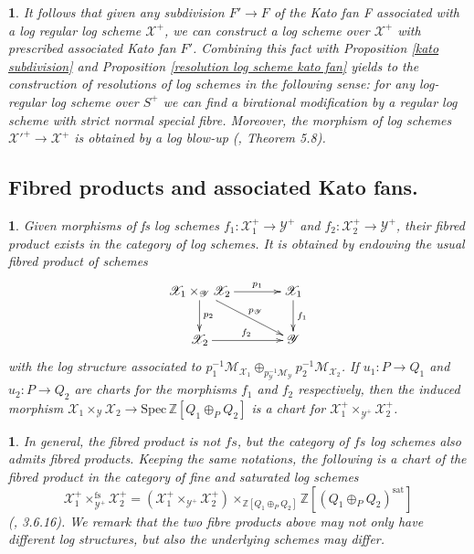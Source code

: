\documentclass{amsart}%
\numberwithin{equation}{subsection}
\theoremstyle{plain2}
\theoremstyle{definition2}
\theoremstyle{stepstyle}
\theoremstyle{point}
\theoremstyle{subpoint}
\newtheorem{subpoint}[equation]{}%
\newcommand{\spa}[1]{\begin{subpoint}#1\end{subpoint}}           %
\newcommand{\Z}{\ensuremath{\mathbb{Z}}}
\newcommand{\cX}{\ensuremath{\mathscr{X}}}
\newcommand{\caM}{\ensuremath{\mathcal{M}}}
\newcommand{\cY}{\ensuremath{\mathscr{Y}}}
\renewcommand{\cY}{\ensuremath{\mathscr{Y}}}
\newcommand{\Spec}{\ensuremath{\mathrm{Spec}\,}}
\begin{document}
\spa{\label{rem resolution via subd}
It follows that given any subdivision $F' \rightarrow F$ of the Kato fan F associated with a log regular log scheme $\cX^+$, we can construct a log scheme over $\cX^+$ with prescribed associated Kato fan $F'$. Combining this fact with Proposition \ref{kato subdivision} and Proposition \ref{resolution log scheme kato fan} yields to the construction of resolutions of log schemes in the following sense: for any log-regular log scheme over $S^+$ we can find a birational modification by a regular log scheme with strict normal special fibre. Moreover, the morphism of log schemes ${\cX'}^+ \rightarrow \cX^+$ is obtained by a log blow-up  (\cite{Niziol2006}, Theorem 5.8).} 


\subsection {Fibred products and associated Kato fans.}\label{sect fs product}
\spa{Given morphisms of \emph{fs} log schemes $f_1: \cX_1^+ \rightarrow \cY^+$ and $f_2: \cX_2^+ \rightarrow \cY^+$, their fibred product exists in the category of log schemes. It is obtained by endowing the usual fibred product of schemes
\begin{equation} \label{fibered product diagram}
\begin{gathered}
\xymatrixcolsep{3pc} \xymatrix{
  \cX_1\times_{\cY} \cX_2 \ar[r]^-{p_1} \ar[dr]^-{p_{\cY}} \ar[d]^-{p_2} & \cX_1 \ar[d]^{f_1}\\
  \cX_2 \ar[r]^{f_2}   & \cY
}
\end{gathered}
\end{equation}
with the log structure associated to $p_1^{-1}\caM_{\cX_1} \oplus_{p_{\cY}^{-1}\caM_{\cY}} p_2^{-1}\caM_{\cX_2}$. If $u_1:P \rightarrow Q_1$ and $u_2:P \rightarrow Q_2$ are charts for the morphisms $f_1$ and $f_2$ respectively, then the induced morphism $\cX_1\times_{\cY} \cX_2 \rightarrow \Spec \Z[Q_1 \oplus_P Q_2]$ is a chart for $\cX_1^+\times_{\cY^+} \cX_2^+$. }

\spa{In general, the fibred product is not $fs$, but the category of $fs$ log schemes also admits fibred products. Keeping the same notations, the following is a chart of the fibred product in the category of fine and saturated log schemes $$\cX_1^+\times_{\cY^+}^{\text{fs}} \cX_2^+ = (\cX_1^+\times_{\cY^+} \cX_2^+) \times_{\Z[Q_1 \oplus_P Q_2]} \Z[(Q_1 \oplus_P Q_2)^{\text{sat}}]$$(\cite{Bultot2015}, 3.6.16). We remark that the two fibre products above may not only have different log structures, but also the underlying schemes may differ.}
\end{document}
